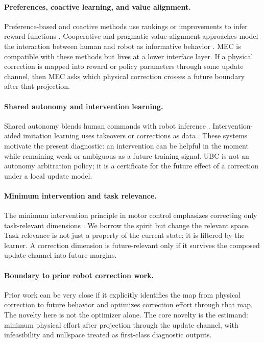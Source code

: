 \documentclass{article}
\begin{document}
\paragraph{Preferences, coactive learning, and value alignment.}
Preference-based and coactive methods use rankings or improvements to infer
reward functions \citep{jain2015learning,sadigh2017active,wirth2017survey,
christiano2017deep}. Cooperative and pragmatic value-alignment approaches model
the interaction between human and robot as informative behavior
\citep{hadfieldmenell2016cirL,fisac2017pragmatic}. MEC is compatible with these
methods but lives at a lower interface layer. If a physical correction is mapped
into reward or policy parameters through some update channel, then MEC asks which
physical correction crosses a future boundary after that projection.

\paragraph{Shared autonomy and intervention learning.}
Shared autonomy blends human commands with robot inference
\citep{javdani2015shared,losey2018review}. Intervention-aided imitation learning
uses takeovers or corrections as data \citep{ross2011dagger,kelly2019hgdagger}.
These systems motivate the present diagnostic: an intervention can be helpful in
the moment while remaining weak or ambiguous as a future training signal. UBC is
not an autonomy arbitration policy; it is a certificate for the future effect of
a correction under a local update model.

\paragraph{Minimum intervention and task relevance.}
The minimum intervention principle in motor control emphasizes correcting only
task-relevant dimensions \citep{todorov2004optimality}. We borrow the spirit but
change the relevant space. Task relevance is not just a property of the current
state; it is filtered by the learner. A correction dimension is future-relevant
only if it survives the composed update channel into future margins.

\paragraph{Boundary to prior robot correction work.}
Prior work can be very close if it explicitly identifies the map from physical
correction to future behavior and optimizes correction effort through that map.
The novelty here is not the optimizer alone. The core novelty is the estimand:
minimum physical effort after projection through the update channel, with
infeasibility and nullspace treated as first-class diagnostic outputs.
\end{document}
